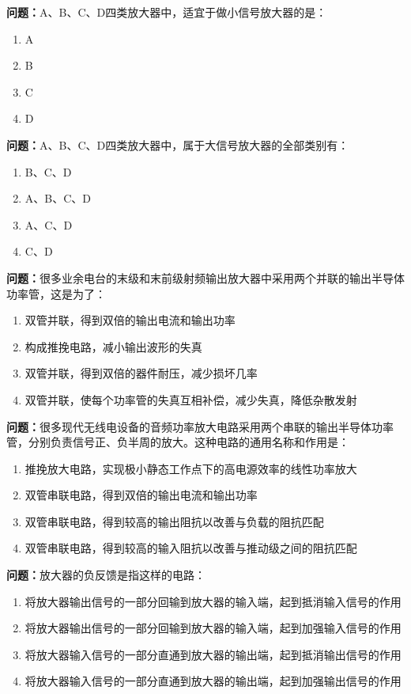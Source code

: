 \bigskip


\noindent\textbf{问题：}A、B、C、D四类放大器中，适宜于做小信号放大器的是：
\begin{enumerate}[label=\Alph*), leftmargin=3em]
\item A
\item B
\item C
\item D
\end{enumerate}

\bigskip


\noindent\textbf{问题：}A、B、C、D四类放大器中，属于大信号放大器的全部类别有：
\begin{enumerate}[label=\Alph*), leftmargin=3em]
\item B、C、D
\item A、B、C、D
\item A、C、D
\item C、D
\end{enumerate}

\bigskip


\noindent\textbf{问题：}很多业余电台的末级和末前级射频输出放大器中采用两个并联的输出半导体功率管，这是为了：
\begin{enumerate}[label=\Alph*), leftmargin=3em]
\item 双管并联，得到双倍的输出电流和输出功率
\item 构成推挽电路，减小输出波形的失真
\item 双管并联，得到双倍的器件耐压，减少损坏几率
\item 双管并联，使每个功率管的失真互相补偿，减少失真，降低杂散发射
\end{enumerate}

\bigskip


\noindent\textbf{问题：}很多现代无线电设备的音频功率放大电路采用两个串联的输出半导体功率管，分别负责信号正、负半周的放大。这种电路的通用名称和作用是：
\begin{enumerate}[label=\Alph*), leftmargin=3em]
\item 推挽放大电路，实现极小静态工作点下的高电源效率的线性功率放大
\item 双管串联电路，得到双倍的输出电流和输出功率
\item 双管串联电路，得到较高的输出阻抗以改善与负载的阻抗匹配
\item 双管串联电路，得到较高的输入阻抗以改善与推动级之间的阻抗匹配
\end{enumerate}

\bigskip


\noindent\textbf{问题：}放大器的负反馈是指这样的电路：
\begin{enumerate}[label=\Alph*), leftmargin=3em]
\item 将放大器输出信号的一部分回输到放大器的输入端，起到抵消输入信号的作用
\item 将放大器输出信号的一部分回输到放大器的输入端，起到加强输入信号的作用
\item 将放大器输入信号的一部分直通到放大器的输出端，起到抵消输出信号的作用
\item 将放大器输入信号的一部分直通到放大器的输出端，起到加强输出信号的作用
\end{enumerate}

